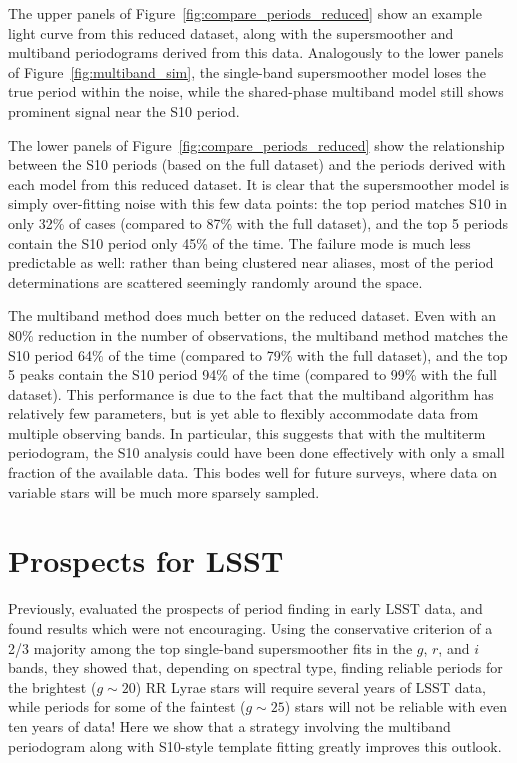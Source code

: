 \documentclass[12pt,preprint]{aastex}
\newcommand{\Fig}[1]{Figure~\ref{fig:#1}}
\newcommand{\fig}[1]{\Fig{#1}}
\newcommand{\sectlabel}[1]{\label{sect:#1}}
\begin{document}
The upper panels of \fig{compare_periods_reduced} show an example light curve from this reduced dataset, along with the supersmoother and multiband periodograms derived from this data. Analogously to the lower panels of \fig{multiband_sim}, the single-band supersmoother model loses the true period within the noise, while the shared-phase multiband model still shows prominent signal near the S10 period.

The lower panels of \fig{compare_periods_reduced} show the relationship between the S10 periods (based on the full dataset) and the periods derived with each model from this reduced dataset. It is clear that the supersmoother model is simply over-fitting noise with this few data points: the top period matches S10 in only 32\% of cases (compared to 87\% with the full dataset), and the top 5 periods contain the S10 period only 45\% of the time. The failure mode is much less predictable as well: rather than being clustered near aliases, most of the period determinations are scattered seemingly randomly around the space.

The multiband method does much better on the reduced dataset. Even with an 80\% reduction in the number of observations, the multiband method matches the S10 period 64\% of the time (compared to 79\% with the full dataset), and the top 5 peaks contain the S10 period 94\% of the time (compared to 99\% with the full dataset). This performance is due to the fact that the multiband algorithm has relatively few parameters, but is yet able to flexibly accommodate data from multiple observing bands. In particular, this suggests that with the multiterm periodogram, the S10 analysis could have been done effectively with only a small fraction of the available data. This bodes well for future surveys, where data on variable stars will be much more sparsely sampled.

\section{Prospects for LSST}
\sectlabel{LSST}
Previously, \citet{Oluseyi12} evaluated the prospects of period finding in early LSST data, and found results which were not encouraging.
Using the conservative criterion of a 2/3 majority among the top single-band supersmoother fits in the $g$, $r$, and $i$ bands, they showed that, depending on spectral type, finding reliable periods for the brightest ($g \sim 20$) RR Lyrae stars will require several years of LSST data, while periods for some of the faintest ($g \sim 25$) stars will not be reliable with even ten years of data!
Here we show that a strategy involving the multiband periodogram along with S10-style template fitting greatly improves this outlook.
\end{document}
